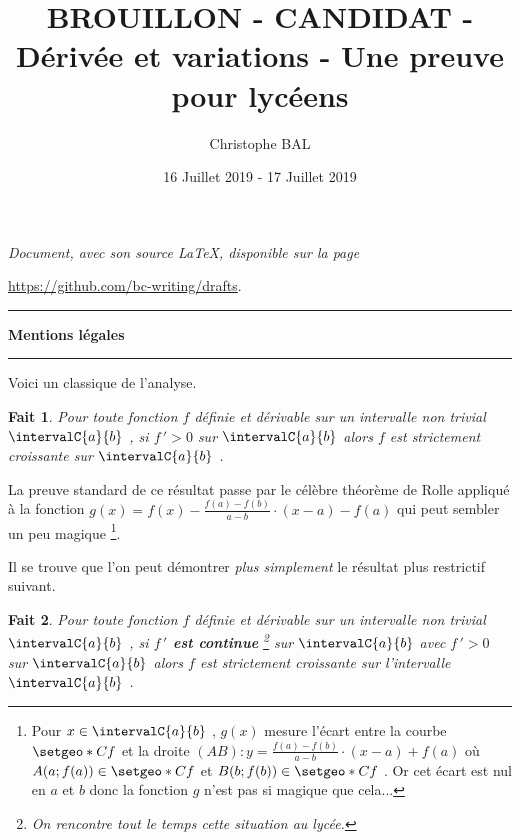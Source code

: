\documentclass[12pt]{amsart}
\newtheorem{fact}{Fait}
\begin{document}
\title{BROUILLON - CANDIDAT - Dérivée et variations - Une preuve pour lycéens}
\author{Christophe BAL}
\date{16 Juillet 2019 - 17 Juillet 2019}

\maketitle

\begin{center}
	\itshape
	Document, avec son source \LaTeX, disponible sur la page
	
	\url{https://github.com/bc-writing/drafts}.
\end{center}


\bigskip


\begin{center}
	\hrule\vspace{.3em}
	{
		\fontsize{1.35em}{1em}\selectfont
		\textbf{Mentions \og légales \fg}
	}
			
	\vspace{0.45em}
	\doclicenseThis
	\hrule
\end{center}


\vspace{1em}


Voici un classique de l'analyse.


\begin{fact}
	Pour toute fonction $f$ définie et dérivable sur un intervalle non trivial $\intervalC{a}{b}$ , si $f\,' > 0$ sur $\intervalC{a}{b}$ alors $f$ est strictement croissante sur $\intervalC{a}{b}$ .
\end{fact}

La preuve standard de ce résultat passe par le célèbre théorème de Rolle appliqué à la fonction $g(x) = f(x) - \frac{f(a) - f(b)}{a - b} \cdot (x - a) - f(a)$ qui peut sembler un peu magique
\footnote{
	Pour $x \in \intervalC{a}{b}$ , $g(x)$ mesure l'écart entre la courbe $\setgeo*{C}{f}$ et la droite $(AB) : y = \frac{f(a) - f(b)}{a - b} \cdot (x - a) + f(a)$ où $A(a ; f(a)) \in \setgeo*{C}{f}$ et $B(b ; f(b)) \in \setgeo*{C}{f}$ .
	Or cet écart est nul en $a$ et $b$ donc la fonction $g$ n'est pas si magique que cela...
}.


\bigskip


Il se trouve que l'on peut démontrer \emph{\og plus simplement \fg} le résultat plus restrictif suivant.


\begin{fact}
	Pour toute fonction $f$ définie et dérivable sur un intervalle non trivial $\intervalC{a}{b}$ ,
	si \textbf{$f\,'$ est continue} 
	\footnote{
		On rencontre tout le temps cette situation au lycée.
	} 
	sur $\intervalC{a}{b}$ avec $f\,' > 0$ sur $\intervalC{a}{b}$
	alors $f$ est strictement croissante sur l'intervalle $\intervalC{a}{b}$ .
\end{fact}
\end{document}
